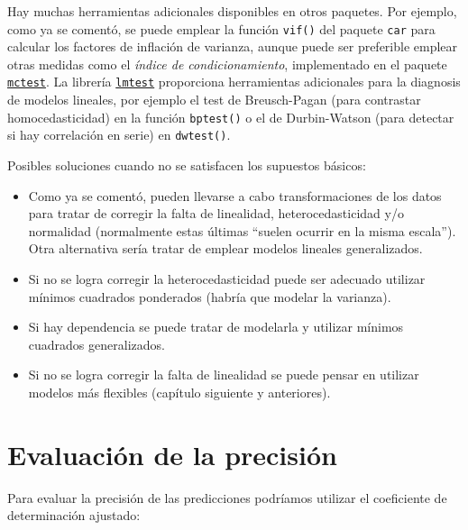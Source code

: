 \documentclass[
]{book}
\newenvironment{Shaded}{\begin{snugshade}}{\end{snugshade}}
\newcommand{\KeywordTok}[1]{\textcolor[rgb]{0.13,0.29,0.53}{\textbf{#1}}}
\newcommand{\NormalTok}[1]{#1}
\newcommand{\OperatorTok}[1]{\textcolor[rgb]{0.81,0.36,0.00}{\textbf{#1}}}
\theoremstyle{break}
\theoremstyle{definition}
\theoremstyle{definition}
\theoremstyle{definition}
\theoremstyle{remark}
\begin{document}
Hay muchas herramientas adicionales disponibles en otros paquetes.
Por ejemplo, como ya se comentó, se puede emplear la función
\texttt{vif()} del paquete \texttt{car} para calcular los factores de inflación de varianza,
aunque puede ser preferible emplear otras medidas como el \emph{índice de condicionamiento},
implementado en el paquete \href{https://CRAN.R-project.org/package=mctest}{\texttt{mctest}}.
La librería \href{https://CRAN.R-project.org/package=lmtest}{\texttt{lmtest}} proporciona herramientas adicionales para la diagnosis de modelos lineales,
por ejemplo el test de Breusch-Pagan (para contrastar homocedasticidad) en la función \texttt{bptest()}
o el de Durbin-Watson (para detectar si hay correlación en serie) en \texttt{dwtest()}.

Posibles soluciones cuando no se satisfacen los supuestos básicos:

\begin{itemize}
\item
  Como ya se comentó, pueden llevarse a cabo transformaciones de los datos para tratar de
  corregir la falta de linealidad, heterocedasticidad y/o normalidad
  (normalmente estas últimas ``suelen ocurrir en la misma escala'').
  Otra alternativa sería tratar de emplear modelos lineales generalizados.
\item
  Si no se logra corregir la heterocedasticidad puede ser adecuado
  utilizar mínimos cuadrados ponderados (habría que modelar la varianza).
\item
  Si hay dependencia se puede tratar de modelarla y utilizar mínimos
  cuadrados generalizados.
\item
  Si no se logra corregir la falta de linealidad se puede pensar en
  utilizar modelos más flexibles (capítulo siguiente y anteriores).
\end{itemize}

\hypertarget{evaluaciuxf3n-de-la-precisiuxf3n}{%
\section{Evaluación de la precisión}\label{evaluaciuxf3n-de-la-precisiuxf3n}}

Para evaluar la precisión de las predicciones podríamos utilizar el coeficiente de determinación ajustado:

\begin{Shaded}
\end{Shaded}
\end{document}
